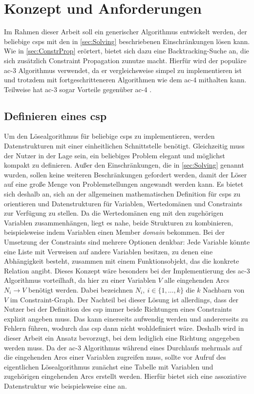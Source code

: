 \section{Konzept und Anforderungen}
\label{sec:Concept}
Im Rahmen dieser Arbeit soll ein generischer Algorithmus entwickelt werden, der beliebige \acp{csp} mit den in \cref{sec:Solving} beschriebenen Einschränkungen lösen kann. Wie in
\cref{sec:ConstrProp} erörtert, bietet sich dazu eine Backtracking-Suche an, die sich zusätzlich Constraint Propagation zunutze macht. Hierfür wird der populäre \ac*{ac}-3
Algorithmus verwendet, da er vergleichsweise simpel zu implementieren ist und trotzdem mit fortgeschritteneren Algorithmen wie dem \ac*{ac}-4 mithalten kann. Teilweise hat
\ac*{ac}-3 sogar Vorteile gegenüber \ac*{ac}-4 \cite{ACAgain}.

\subsection{Definieren eines \ac*{csp}}
\label{sec:CSPDef}
Um den Lösealgorithmus für beliebige \acp{csp} zu implementieren, werden Datenstrukturen mit einer einheitlichen Schnittstelle benötigt. Gleichzeitig muss der Nutzer in der Lage
sein, ein beliebiges Problem elegant und möglichst kompakt zu definieren. Außer den Einschränkungen, die in \cref{sec:Solving} genannt wurden, sollen keine weiteren Beschränkungen
gefordert werden, damit der Löser auf eine große Menge von Problemstellungen angewandt werden kann. Es bietet sich deshalb an, sich an der allgemeinen mathematischen Definition
für \acp{csp} zu orientieren und Datenstrukturen für Variablen, Wertedomänen und Constraints zur Verfügung zu stellen. Da die Wertedomänen eng mit den zugehörigen Variablen
zusammenhängen, liegt es nahe, beide Strukturen zu kombinieren, beispielsweise indem Variablen einen Member \textit{domain} bekommen. Bei der Umsetzung der Constraints sind
mehrere Optionen denkbar: Jede Variable könnte eine Liste mit Verweisen auf andere Variablen besitzen, zu denen eine Abhängigkeit besteht, zusammen mit einem Funktionsobjekt, das
die konkrete Relation angibt. Dieses Konzept wäre besonders bei der Implementierung des \ac*{ac}-3 Algorithmus vorteilhaft, da hier zu einer Variablen $V$ alle eingehenden Arcs
$N_i \rightarrow V$ benötigt werden. Dabei bezeichnen $N_i, \ i \in \{1, \dots, k\}$ die $k$ Nachbarn von $V$ im Constraint-Graph. Der Nachteil bei dieser Lösung ist allerdings,
dass der Nutzer bei der Definition des \ac*{csp} immer beide Richtungen eines Constraints explizit angeben muss. Das kann einerseits aufwendig werden und andererseits zu Fehlern
führen, wodurch das \ac*{csp} dann nicht wohldefiniert wäre. Deshalb wird in dieser Arbeit ein Ansatz bevorzugt, bei dem lediglich eine Richtung angegeben werden muss. Da der
\ac*{ac}-3 Algorithmus während eines Durchlaufs mehrmals auf die eingehenden Arcs einer Variablen zugreifen muss, sollte vor Aufruf des eigentlichen Lösealgorithmus zunächst eine
Tabelle mit Variablen und zugehörigen eingehenden Arcs erstellt werden. Hierfür bietet sich eine assoziative Datenstruktur wie beispielsweise eine  an.

